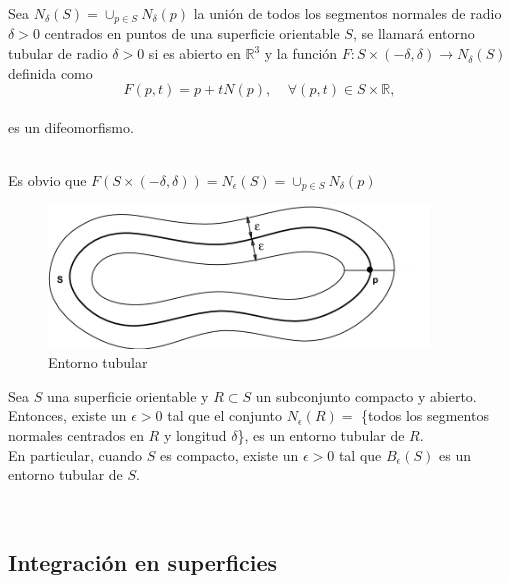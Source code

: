 \begin{definicion}
	Sea $N_{\delta}(S) = \cup_{p \in S} N_{\delta}(p)$ la unión de todos los segmentos normales de radio $\delta > 0$ centrados en puntos de una superficie orientable $S$, se llamará entorno tubular de radio $\delta > 0$ si es abierto en $\mathbb{R}^3$ y la función $F : S \times (-\delta, \delta) \to N_{\delta}(S)$ definida como
	${ }$\\
	$$ F(p,t) = p +tN(p), \;\;\;\; \forall (p,t) \in S \times \mathbb{R}, $$
	${ }$\\
	es un difeomorfismo.
\end{definicion}
${ }$\\

Es obvio que $F(S \times (-\delta, \delta)) = N_{\epsilon}(S) = \cup_{p \in S} N_{\delta}(p)$
${ }$\\

\begin{figure}[h]
	\begin{center}
		\includegraphics[width=0.9\textwidth]{imagenes/tubular.png}
	\end{center}
	\caption{Entorno tubular}
	\label{fig:etiq_13}
\end{figure}

\begin{teorema}
	Sea $S$ una superficie orientable y $R \subset S$ un subconjunto compacto y abierto. Entonces, existe un $\epsilon > 0$ tal que el conjunto $N_{\epsilon}(R) =$ \{todos los segmentos normales centrados en $R$ y longitud $\delta$\}, es un entorno tubular de $R$.
	${ }$\\
	
	En particular, cuando $S$ es compacto, existe un $\epsilon > 0$ tal que $B_{\epsilon}(S)$ es un entorno tubular de $S$.
\end{teorema}




${ }$\\
\subsection{Integración en superficies}
${ }$\\

